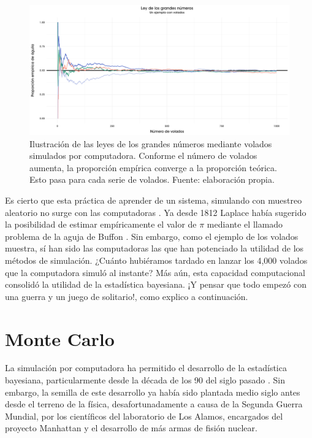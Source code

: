 \begin{figure}[h]
	\centering
	\includegraphics[scale=0.2]{Figs/Bayes/LGN}
	\caption{Ilustración de las leyes de los grandes números mediante volados simulados por computadora. Conforme el número de volados aumenta, la proporción empírica converge a la proporción teórica. Esto pasa para cada serie de volados. Fuente: elaboración propia.}
	\label{fig:LGN}	
\end{figure}

Es cierto que esta práctica de aprender de un sistema, simulando con muestreo aleatorio no surge con las computadoras \parencite{Owen13}. Ya desde 1812 Laplace había sugerido la posibilidad de estimar empíricamente el valor de $\pi$ mediante el llamado problema de la aguja de Buffon \parencite{Ragheb13}. Sin embargo, como el ejemplo de los volados muestra, sí han sido las computadoras las que han potenciado la utilidad de los métodos de simulación. ¿Cuánto hubiéramos tardado en lanzar los 4,000 volados que la computadora simuló al instante? Más aún, esta capacidad computacional consolidó la utilidad de la estadística bayesiana. ¡Y pensar que todo empezó con una guerra y un juego de solitario!, como explico a continuación.

\section{Monte Carlo} 

La simulación por computadora ha permitido el desarrollo de la estadística bayesiana, particularmente desde la década de los 90 del siglo pasado \parencite{RobertCasella11}. Sin embargo, la semilla de este desarrollo ya había sido plantada medio siglo antes desde el terreno de la física, desafortunadamente a causa de la Segunda Guerra Mundial, por los científicos del laboratorio de Los Alamos, encargados del proyecto Manhattan y el desarrollo de más armas de fisión nuclear.\\

